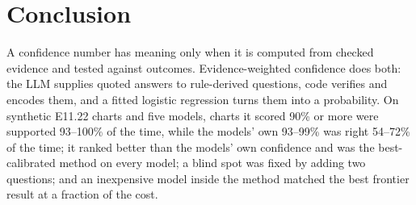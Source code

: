 \documentclass[10pt,letterpaper]{article}
\begin{document}
\section{Conclusion}

A confidence number has meaning only when it is computed from checked evidence and tested against outcomes. Evidence-weighted confidence does both: the LLM supplies quoted answers to rule-derived questions, code verifies and encodes them, and a fitted logistic regression turns them into a probability. On synthetic E11.22 charts and five models, charts it scored 90\% or more were supported 93--100\% of the time, while the models' own 93--99\% was right 54--72\% of the time; it ranked better than the models' own confidence and was the best-calibrated method on every model; a blind spot was fixed by adding two questions; and an inexpensive model inside the method matched the best frontier result at a fraction of the cost.
\end{document}
